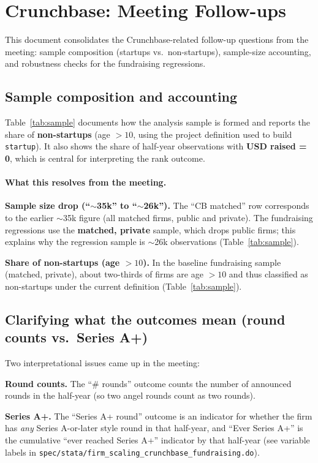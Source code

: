 \documentclass{article}
\newcommand{\cleanedresultsdir}{../results/cleaned/tex}
\begin{document}
\thispagestyle{empty}

\section*{Crunchbase: Meeting Follow-ups}

This document consolidates the Crunchbase-related follow-up questions from the meeting:
sample composition (startups vs.\ non-startups), sample-size accounting, and robustness checks for the fundraising regressions.

\subsection*{Sample composition and accounting}
Table~\ref{tab:sample} documents how the analysis sample is formed and reports the share of \textbf{non-startups}
(age $>10$, using the project definition used to build \texttt{startup}).
It also shows the share of half-year observations with \textbf{USD raised = 0}, which is central for interpreting
the rank outcome.

\begin{table}[H]
\caption{Sample composition and accounting}
\label{tab:sample}

\end{table}

\paragraph{What this resolves from the meeting.}
\textbf{Sample size drop (``$\sim$35k'' to ``$\sim$26k'').} The ``CB matched'' row corresponds to the earlier $\sim$35k
figure (all matched firms, public and private). The fundraising regressions use the \textbf{matched, private} sample,
which drops public firms; this explains why the regression sample is $\sim$26k observations (Table~\ref{tab:sample}).
\par
\textbf{Share of non-startups (age $>10$).} In the baseline fundraising sample (matched, private), about two-thirds of
firms are age $>10$ and thus classified as non-startups under the current definition (Table~\ref{tab:sample}).

\subsection*{Clarifying what the outcomes mean (round counts vs.\ Series A+)}
Two interpretational issues came up in the meeting:
\par
\textbf{Round counts.} The ``\# rounds'' outcome counts the number of announced rounds in the half-year (so two angel
rounds count as two rounds).
\par
\textbf{Series A+.} The ``Series A+ round'' outcome is an indicator for whether the firm has \emph{any} Series A-or-later
style round in that half-year, and ``Ever Series A+'' is the cumulative ``ever reached Series A+'' indicator by that
half-year (see variable labels in \texttt{spec/stata/firm\_scaling\_crunchbase\_fundraising.do}).
\end{document}
